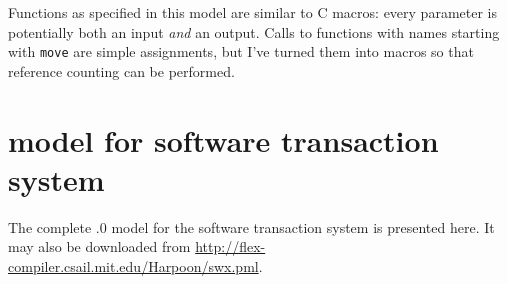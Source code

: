Functions as specified in this model are similar to C macros: every
parameter is potentially both an input {\it and} an output.  Calls to
functions with names starting with {\tt move} are simple assignments,
but I've turned them into macros so that reference counting
can be performed.

\section{\Spin model for software transaction system}
The complete .0 model for the \flex software transaction system is
presented here.  It may also be downloaded from
\url{http://flex-compiler.csail.mit.edu/Harpoon/swx.pml}.

{\linespread{0.9}\footnotesize}

